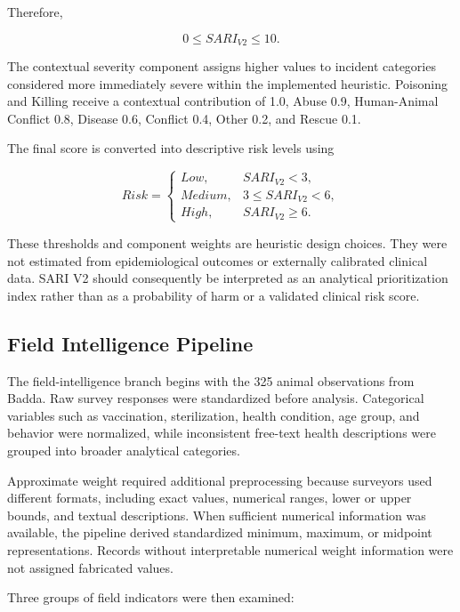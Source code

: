 \documentclass[conference]{IEEEtran}
\begin{document}
Therefore,

\begin{equation}
0 \leq SARI_{V2} \leq 10.
\end{equation}

The contextual severity component assigns higher values to incident
categories considered more immediately severe within the implemented
heuristic. Poisoning and Killing receive a contextual contribution of 1.0,
Abuse 0.9, Human-Animal Conflict 0.8, Disease 0.6, Conflict 0.4,
Other 0.2, and Rescue 0.1.

The final score is converted into descriptive risk levels using

\begin{equation}
Risk =
\begin{cases}
Low, & SARI_{V2}<3,\\
Medium, & 3\leq SARI_{V2}<6,\\
High, & SARI_{V2}\geq6.
\end{cases}
\end{equation}

These thresholds and component weights are heuristic design choices. They
were not estimated from epidemiological outcomes or externally calibrated
clinical data. SARI V2 should consequently be interpreted as an analytical
prioritization index rather than as a probability of harm or a validated
clinical risk score.

\subsection{Field Intelligence Pipeline}

The field-intelligence branch begins with the 325 animal observations from
Badda. Raw survey responses were standardized before analysis. Categorical
variables such as vaccination, sterilization, health condition, age group,
and behavior were normalized, while inconsistent free-text health
descriptions were grouped into broader analytical categories.

Approximate weight required additional preprocessing because surveyors used
different formats, including exact values, numerical ranges, lower or upper
bounds, and textual descriptions. When sufficient numerical information was
available, the pipeline derived standardized minimum, maximum, or midpoint
representations. Records without interpretable numerical weight information
were not assigned fabricated values.

Three groups of field indicators were then examined:
\end{document}
